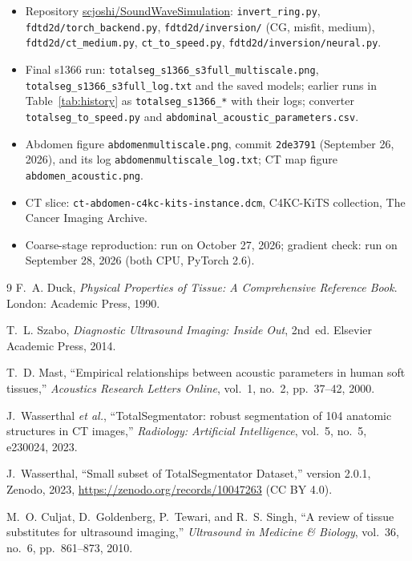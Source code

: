 \documentclass[11pt]{article}
\newcommand{\code}[1]{\texttt{#1}}
\begin{document}
\begin{itemize}
  \item Repository
    \href{https://github.com/scjoshi/SoundWaveSimulation}{scjoshi/SoundWaveSimulation}:
    \code{invert\_ring.py}, \code{fdtd2d/torch\_backend.py},
    \code{fdtd2d/inversion/} (CG, misfit, medium), \code{fdtd2d/ct\_medium.py},
    \code{ct\_to\_speed.py}, \code{fdtd2d/inversion/neural.py}.
  \item Final s1366 run: \code{totalseg\_s1366\_s3full\_multiscale.png},
    \code{totalseg\_s1366\_s3full\_log.txt} and the saved models; earlier runs
    in Table~\ref{tab:history} as \code{totalseg\_s1366\_*} with their logs;
    converter \code{totalseg\_to\_speed.py} and
    \code{abdominal\_acoustic\_parameters.csv}.
  \item Abdomen figure \code{abdomenmultiscale.png}, commit \code{2de3791}
    (September 26, 2026), and its log \code{abdomenmultiscale\_log.txt}; CT map
    figure \code{abdomen\_acoustic.png}.
  \item CT slice: \code{ct-abdomen-c4kc-kits-instance.dcm}, C4KC-KiTS
    collection, The Cancer Imaging Archive.
  \item Coarse-stage reproduction: run on October 27, 2026; gradient check: run
    on September 28, 2026 (both CPU, PyTorch 2.6).
\end{itemize}

\begin{thebibliography}{9}
F.~A. Duck, \emph{Physical Properties of Tissue: A Comprehensive Reference
Book}. London: Academic Press, 1990.

T.~L. Szabo, \emph{Diagnostic Ultrasound Imaging: Inside Out}, 2nd~ed.
Elsevier Academic Press, 2014.

T.~D. Mast, ``Empirical relationships between acoustic parameters in human soft
tissues,'' \emph{Acoustics Research Letters Online}, vol.~1, no.~2,
pp.~37--42, 2000.

J.~Wasserthal \emph{et al.},
``TotalSegmentator: robust segmentation of 104 anatomic structures in CT
images,'' \emph{Radiology: Artificial Intelligence}, vol.~5, no.~5, e230024, 2023.

J.~Wasserthal, ``Small subset of TotalSegmentator Dataset,'' version 2.0.1,
Zenodo, 2023, \url{https://zenodo.org/records/10047263} (CC BY 4.0).

M.~O. Culjat, D.~Goldenberg, P.~Tewari, and R.~S. Singh,
``A review of tissue substitutes for ultrasound imaging,''
\emph{Ultrasound in Medicine \& Biology}, vol.~36, no.~6, pp.~861--873, 2010.
\end{thebibliography}
\end{document}
